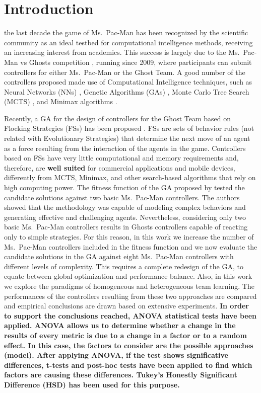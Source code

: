 \documentclass[journal]{IEEEtran}
\begin{document}
\section{Introduction}
\label{sec:Introduction}

 the last decade the game of Ms.\  Pac-Man has been recognized by the scientific community as an ideal testbed for computational intelligence methods, receiving an increasing interest from academics. This success is largely due to the Ms.\  Pac-Man vs Ghosts competition \cite{Lucas2009,MsPacManVSGhost2011}, running since 2009, where participants can submit controllers for either Ms.\  Pac-Man or the Ghost Team. A good number of the controllers proposed made use of Computational Intelligence techniques, such as Neural Networks (NNs) \cite{Rojas1996}, Genetic Algorithms (GAs) \cite{Goldberg1988}, Monte Carlo Tree Search (MCTS) \cite{Browne2012}, and Minimax algorithms \cite{Osborne1994}.

Recently, a GA for the design of controllers for the Ghost Team based on Flocking Strategies (FSs) has been proposed \cite{Liberatore2014}. FSs are sets of behavior rules (not related with Evolutionary Strategies) that determine the next move of an agent as a force resulting from the interaction of the agents in the game. Controllers based on FSs have very little computational and memory requirements and, therefore, are \textbf{well suited} for commercial applications and mobile devices, differently from MCTS, Minimax, and other search-based algorithms that rely on high computing power. The fitness function of the GA proposed by \cite{Liberatore2014} tested the candidate solutions against two basic Ms.\  Pac-Man controllers. The authors showed that the methodology was capable of modeling complex behaviors and generating effective and challenging agents. Nevertheless, considering only two basic Ms.\  Pac-Man controllers results in Ghosts controllers capable of reacting only to simple strategies. For this reason, in this work we increase the number of Ms.\  Pac-Man controllers included in the fitness function and we now evaluate the candidate solutions in the GA against eight Ms.\  Pac-Man controllers with different levels of complexity. This requires a complete redesign of the GA, to equate between global optimization and performance balance. Also, in this work we explore the paradigms of homogeneous and heterogeneous team learning. The performances of the controllers resulting from these two approaches are compared and empirical conclusions are drawn based on extensive experiments. \textbf{In order to support the conclusions reached, ANOVA statistical tests \cite{Fisher25,Fisher36} have been applied. ANOVA allows us to determine whether a change in the results of every metric is due to a change in a factor or to a random effect. In this case, the factors to consider are the possible approaches (model). After applying ANOVA, if the test shows significative differences, t-tests and post-hoc tests have been applied to find which factors are causing these differences. Tukey’s Honestly Significant Difference (HSD) \cite{Dickinson1971} has been used for this purpose.}
\end{document}
